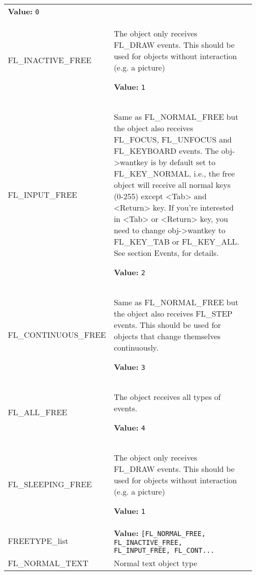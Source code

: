 \begin{longtable}{|p{\varnamewidth}|p{\vardescrwidth}|l}
\textbf{Value:} 
{\tt 0}&\\
\cline{1-2}
\raggedright F\-L\-\_\-I\-N\-A\-C\-T\-I\-V\-E\-\_\-F\-R\-E\-E\- & \raggedright The object only receives FL\_DRAW events. This should be used for
objects without interaction (e.g. a picture)

\textbf{Value:} 
{\tt 1}&\\
\cline{1-2}
\raggedright F\-L\-\_\-I\-N\-P\-U\-T\-\_\-F\-R\-E\-E\- & \raggedright Same as FL\_NORMAL\_FREE but the object also receives FL\_FOCUS,
FL\_UNFOCUS and FL\_KEYBOARD events. The obj->wantkey is by default set to
FL\_KEY\_NORMAL, i.e., the free object will receive all normal keys (0-255)
except <Tab> and <Return> key. If you're interested in <Tab> or <Return>
key, you need to change obj->wantkey to FL\_KEY\_TAB or FL\_KEY\_ALL. See
section Events, for details.

\textbf{Value:} 
{\tt 2}&\\
\cline{1-2}
\raggedright F\-L\-\_\-C\-O\-N\-T\-I\-N\-U\-O\-U\-S\-\_\-F\-R\-E\-E\- & \raggedright Same as FL\_NORMAL\_FREE but the object also receives FL\_STEP events.
This should be used for objects that change themselves continuously.

\textbf{Value:} 
{\tt 3}&\\
\cline{1-2}
\raggedright F\-L\-\_\-A\-L\-L\-\_\-F\-R\-E\-E\- & \raggedright The object receives all types of events.

\textbf{Value:} 
{\tt 4}&\\
\cline{1-2}
\raggedright F\-L\-\_\-S\-L\-E\-E\-P\-I\-N\-G\-\_\-F\-R\-E\-E\- & \raggedright The object only receives FL\_DRAW events. This should be used for objects
without interaction (e.g. a picture)

\textbf{Value:} 
{\tt 1}&\\
\cline{1-2}
\raggedright F\-R\-E\-E\-T\-Y\-P\-E\-\_\-l\-i\-s\-t\- & \raggedright \textbf{Value:} 
{\tt [FL\_NORMAL\_FREE, FL\_INACTIVE\_FREE, FL\_INPUT\_FREE, FL\_CONT\texttt{...}}&\\
\cline{1-2}
\raggedright F\-L\-\_\-N\-O\-R\-M\-A\-L\-\_\-T\-E\-X\-T\- & \raggedright Normal text object type


\end{longtable}
